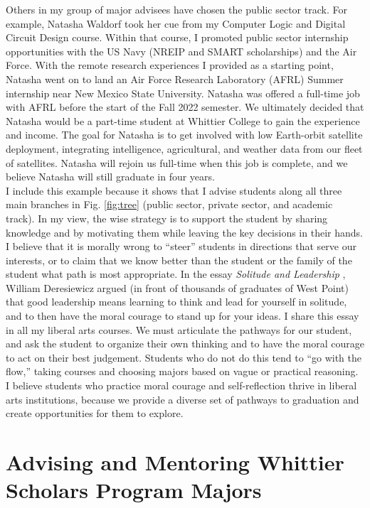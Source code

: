 \documentclass[../../main.tex]{subfiles}
\begin{document}
Others in my group of major advisees have chosen the public sector track.  For example, Natasha Waldorf took her cue from my Computer Logic and Digital Circuit Design course.  Within that course, I promoted public sector internship opportunities with the US Navy (NREIP and SMART scholarships) and the Air Force.  With the remote research experiences I provided as a starting point, Natasha went on to land an Air Force Research Laboratory (AFRL) Summer internship near New Mexico State University.  Natasha was offered a full-time job with AFRL before the start of the Fall 2022 semester.  We ultimately decided that Natasha would be a part-time student at Whittier College to gain the experience and income.  The goal for Natasha is to get involved with low Earth-orbit satellite deployment, integrating intelligence, agricultural, and weather data from our fleet of satellites.  Natasha will rejoin us full-time when this job is complete, and we believe Natasha will still graduate in four years.
\\
\vspace{0.15cm}
I include this example because it shows that I advise students along all three main branches in Fig. \ref{fig:tree} (public sector, private sector, and academic track).  In my view, the wise strategy is to support the student by sharing knowledge and by motivating them while leaving the key decisions in their hands.  I believe that it is morally wrong to ``steer'' students in directions that serve our interests, or to claim that we know better than the student or the family of the student what path is most appropriate.  In the essay \textit{Solitude and Leadership} \cite{west_point}, William Deresiewicz argued (in front of thousands of graduates of West Point) that good leadership means learning to think and lead for yourself in solitude, and to then have the moral courage to stand up for your ideas.  I share this essay in all my liberal arts courses.  We must articulate the pathways for our student, and ask the student to organize their own thinking and to have the moral courage to act on their best judgement.  Students who do not do this tend to ``go with the flow,'' taking courses and choosing majors based on vague or practical reasoning.  I believe students who practice moral courage and self-reflection thrive in liberal arts institutions, because we provide a diverse set of pathways to graduation and create opportunities for them to explore.

\section{Advising and Mentoring Whittier Scholars Program Majors}
\end{document}
